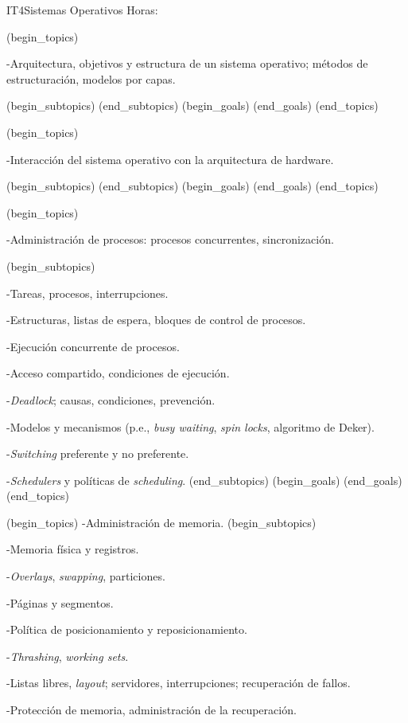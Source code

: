 \begin{BKL2}{IT4}{Sistemas Operativos}
Horas:
 
(begin_topics)

-Arquitectura, objetivos y estructura de un sistema operativo; métodos de estructuración, modelos por capas.

(begin_subtopics)
(end_subtopics)
(begin_goals)
(end_goals)
(end_topics)

 

(begin_topics)

-Interacción del sistema operativo con la arquitectura de hardware.

(begin_subtopics)
(end_subtopics)
(begin_goals)
(end_goals)
(end_topics)

 

(begin_topics)

-Administración de procesos: procesos concurrentes, sincronización.

(begin_subtopics)

-Tareas, procesos, interrupciones.

-Estructuras, listas de espera, bloques de control de procesos.

-Ejecución concurrente de procesos.

-Acceso compartido, condiciones de ejecución.

-\textit{Deadlock}; causas, condiciones, prevención.

-Modelos y mecanismos (p.e., \textit{busy waiting}, \textit{spin locks}, algoritmo de Deker).

-\textit{Switching} preferente y no preferente.

-\textit{Schedulers} y políticas de \textit{scheduling}.
(end_subtopics)
(begin_goals)
(end_goals)
(end_topics)

 

(begin_topics)
-Administración de memoria.
(begin_subtopics)

-Memoria física y registros.

-\textit{Overlays}, \textit{swapping}, particiones.

-Páginas y segmentos.

-Política de posicionamiento y reposicionamiento.

-\textit{Thrashing}, \textit{working sets}.

-Listas libres, \textit{layout}; servidores, interrupciones; recuperación de fallos.

-Protección de memoria, administración de la recuperación.


\end{BKL2}

